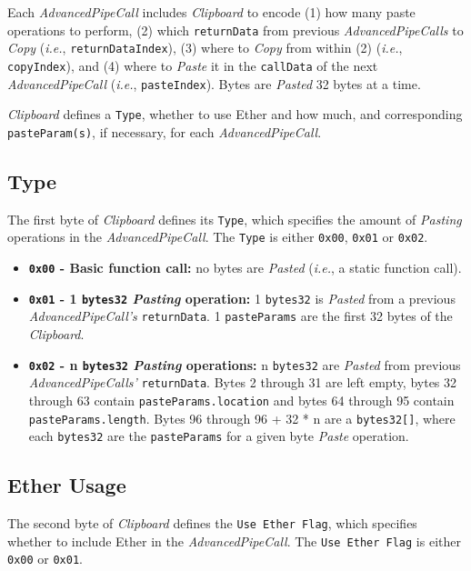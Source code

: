 \documentclass[tikz]{article}
\newcommand{\code}[1]{\texttt{#1}}
\newcommand{\term}[1]{\textsl{#1}}
\begin{document}
Each \term{AdvancedPipeCall} includes \term{Clipboard} to encode (1) how many paste operations to perform, (2) which \code{returnData} from previous \term{AdvancedPipeCalls} to \term{Copy} (\term{i.e.}, \code{returnDataIndex}), (3) where to \term{Copy} from within (2) (\term{i.e.}, \code{copyIndex}), and (4) where to \term{Paste} it in the \code{callData} of the next \term{AdvancedPipeCall} (\term{i.e.}, \code{pasteIndex}). Bytes are \term{Pasted} 32 bytes at a time.

\term{Clipboard} defines a \code{Type}, whether to use Ether and how much, and corresponding \code{pasteParam(s)}, if necessary, for each \term{AdvancedPipeCall}.

\newpage
\subsection{Type}
The first byte of \term{Clipboard} defines its \code{Type}, which specifies the amount of \term{Pasting} operations in the \term{AdvancedPipeCall}. The \code{Type} is either \code{0x00}, \code{0x01} or \code{0x02}.

\begin{itemize}
    \item \textbf{\code{0x00} - Basic function call:} no bytes are \term{Pasted} (\term{i.e.}, a static function call).
    \item \textbf{\code{0x01} - 1 \code{bytes32} \term{Pasting} operation:} 1 \code{bytes32} is \term{Pasted} from a previous \term{AdvancedPipeCall's} \code{returnData}. 1 \code{pasteParams} are the first 32 bytes of the \term{Clipboard}.
    \item \textbf{\code{0x02} - n \code{bytes32} \term{Pasting} operations:} n \code{bytes32} are \term{Pasted} from previous \term{AdvancedPipeCalls'} \code{returnData}. Bytes 2 through 31 are left empty, bytes 32 through 63 contain \code{pasteParams.location} and bytes 64 through 95 contain \code{pasteParams.length}. Bytes 96 through 96 + 32 * n are a \code{bytes32[]}, where each \code{bytes32} are the \code{pasteParams} for a given byte \term{Paste} operation.
\end{itemize}

\subsection{Ether Usage}
The second byte of \term{Clipboard} defines the \code{Use Ether Flag}, which specifies whether to include Ether in the \term{AdvancedPipeCall}. The \code{Use Ether Flag} is either \code{0x00} or \code{0x01}.
\end{document}
